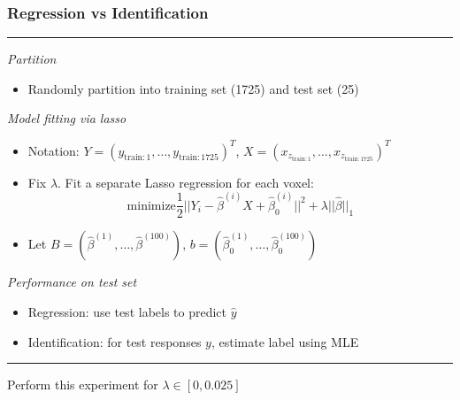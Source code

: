 \documentclass{beamer}
\begin{document}
\begin{frame}
\frametitle{Regression vs Identification}
\noindent\rule[0.5ex]{\linewidth}{0.5pt}
\emph{Partition}
\begin{itemize}
\item Randomly partition into training set (1725) and test set (25)
\end{itemize}
\emph{Model fitting via lasso}
\begin{itemize}
\item Notation: $Y = (y_{\text{train}: 1},\hdots, y_{\text{train}:1725})^T$, $X = (x_{z_{\text{train}: 1}},\hdots, x_{z_{\text{train}:1725}})^T$
\item Fix $\lambda$.  Fit a separate Lasso regression for each voxel:
\[
\text{minimize} \frac{1}{2}||Y_i - \hat{\beta}^{(i)} X + \hat{\beta}_0^{(i)}||^2 + \lambda ||\hat{\beta}||_1
\]
\item Let $B = (\hat{\beta}^{(1)},\hdots, \hat{\beta}^{(100)})$, $b = (\hat{\beta}_0^{(1)},\hdots, \hat{\beta}_0^{(100)})$
\end{itemize}
\emph{Performance on test set}
\begin{itemize}
\item Regression: use test labels to predict $\hat{y}$
\item Identification: for test responses $y$, estimate label using MLE
\end{itemize}
\noindent\rule[0.5ex]{\linewidth}{0.5pt}
\vspace{0.1in}
Perform this experiment for $\lambda \in [0, 0.025]$
\end{frame}
\end{document}
